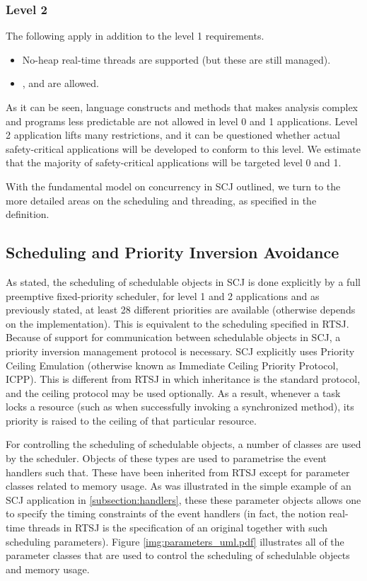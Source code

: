\subsubsection{Level 2}
The following apply in addition to the level 1 requirements.
\begin{itemize}
	\item No-heap real-time threads are supported (but these are still managed).
	\item {},  and  are allowed.
\end{itemize}

As it can be seen, language constructs and methods that makes analysis complex and programs less predictable are not allowed in level 0 and 1 applications. Level 2 application lifts many restrictions, and it can be questioned whether actual safety-critical applications will be developed to conform to this level. We estimate that the majority of safety-critical applications will be targeted level 0 and 1.

With the fundamental model on concurrency in SCJ outlined, we turn to the more detailed areas on the scheduling and threading, as specified in the definition.

\subsection{Scheduling and Priority Inversion Avoidance} %
\label{sub:schedulingobjects}
As stated, the scheduling of schedulable objects in SCJ is done explicitly by a full preemptive fixed-priority scheduler, for level 1 and 2 applications and as previously stated, at least 28 different priorities are available (otherwise depends on the implementation). This is equivalent to the scheduling specified in RTSJ. Because of support for communication between schedulable objects in SCJ, a priority inversion management protocol is necessary. SCJ explicitly uses Priority Ceiling Emulation (otherwise known as Immediate Ceiling Priority Protocol, ICPP). This is different from RTSJ in which inheritance is the standard protocol, and the ceiling protocol may be used optionally. As a result, whenever a task locks a resource (such as when successfully invoking a synchronized method), its priority is raised to the ceiling of that particular resource.

For controlling the scheduling of schedulable objects, a number of classes are used by the scheduler. Objects of these types are used to parametrise the event handlers such that. These have been inherited from RTSJ except for parameter classes related to memory usage. As was illustrated in the simple example of an SCJ application in \ref{subsection:handlers}, these these parameter objects allows one to specify the timing constraints of the event handlers (in fact, the notion real-time threads in RTSJ is the specification of an original  together with such scheduling parameters). Figure \ref{img:parameters_uml.pdf} illustrates all of the parameter classes that are used to control the scheduling of schedulable objects and memory usage.

